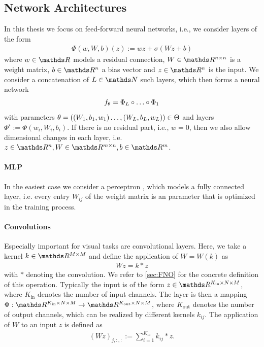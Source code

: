 \subsection{Network Architectures}
%
%
In this thesis we focus on feed-forward neural networks, i.e., we consider layers of the form
%
\begin{align}\label{eq:layer}
\Phi(w, W, b)(z):= wz + \sigma(Wz + b)
\end{align}
%
where $w\in\R$ models a residual connection, $W\in\R^{n\times n}$ is a weight matrix, $b\in\R^n$ a bias vector and $z\in\R^{n}$ is the input. We consider a concatenation of $L\in\N$ such layers, which then forms a neural network
%
\begin{align*}
f_\theta = \Phi_L\circ\ldots\circ\Phi_1
\end{align*} 
%
with parameters $\theta =((W_1,b_1,w_1)\ldots,(W_L,b_L,w_L))\in\Theta$ and layers $\Phi^i := \Phi(w_i, W_i, b_i)$. If there is no residual part, i.e., $w=0$, then we also allow dimensional changes in each layer, i.e. $z\in\R^n, W\in\R^{m\times n}, b\in\R^m$. 
%
\paragraph{MLP} In the easiest case we consider a perceptron \cite{rosenblatt1958perceptron}, which models a fully connected layer, i.e. every entry $W_{ij}$ of the weight matrix is an parameter that is optimized in the training process.

\paragraph{Convolutions}\label{sec:convlayer} Especially important for visual tasks are convolutional layers. Here, we take a kernel $k\in \R^{M\times M}$ and define the application of $W=W(k)$ as
%
\begin{align*}
Wz = k\ast z
\end{align*}
%
with $\ast$ denoting the convolution. We refer to \cref{sec:FNO} for the concrete definition of this operation. Typically the input is of the form $z\in\R^{K_{\text{in}}\times N \times M}$, where $K_{\text{in}}$ denotes the number of input channels. The layer is then a mapping $\Phi:\R^{K_{\text{in}}\times N \times M}\to\R^{K_{\text{out}}\times N \times M}$, where $K_{\text{out}}$ denotes the number of output channels, which can be realized by different kernels $k_{ij}$. The application of $W$ to an input $z$ is defined as
%
\begin{align*}
(Wz)_{j,:,:} := \sum_{i=1}^{K_{\text{in}}} k_{ij}\ast z.
\end{align*}

